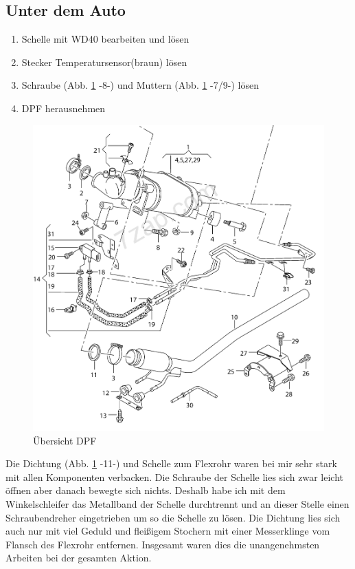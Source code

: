 \documentclass[twoside,a4paper]{refart}
\begin{document}
\subsection{Unter dem Auto}
\begin{enumerate}
\item Schelle mit WD40 bearbeiten und lösen
\item Stecker Temperatursensor(braun) lösen
\item Schraube (Abb. \ref{fig:ubersicht} -8-) und Muttern (Abb. \ref{fig:ubersicht} -7/9-) lösen
\item DPF herausnehmen
\end{enumerate}
\begin{figure}[htb]
	\begin{center}
		\includegraphics[width=\textwidth]{UbersichtDPF}
		\caption{Übersicht DPF}
		\label{fig:ubersicht}
	\end{center}
\end{figure}
Die Dichtung (Abb. \ref{fig:ubersicht} -11-) und Schelle zum Flexrohr waren bei mir sehr stark mit allen Komponenten verbacken. Die Schraube der Schelle lies sich zwar leicht öffnen aber danach bewegte sich nichts. Deshalb habe ich mit dem Winkelschleifer das Metallband der Schelle durchtrennt und an dieser Stelle einen Schraubendreher eingetrieben um so die Schelle zu lösen. Die Dichtung lies sich auch nur mit viel Geduld und fleißigem Stochern mit einer Messerklinge vom Flansch des Flexrohr entfernen. Insgesamt waren dies die unangenehmsten Arbeiten bei der gesamten Aktion.
\newpage
\end{document}
